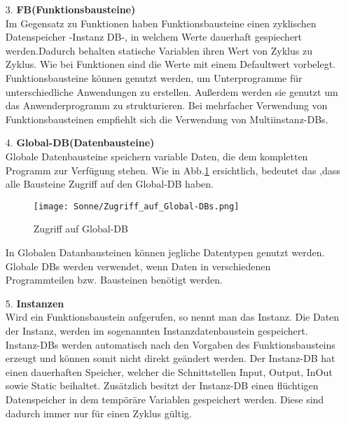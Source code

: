 \begin{itemize}
        \item[3.] \textbf{FB(Funktionsbausteine)} \\
            Im Gegensatz zu Funktionen haben Funktionsbausteine einen zyklischen Datenspeicher -Instanz DB-, in welchem Werte dauerhaft gespiechert werden.Dadurch behalten statische Variablen ihren Wert von Zyklus zu Zyklus. Wie bei Funktionen sind die Werte mit einem Defaultwert vorbelegt.\\
            Funktionsbausteine können genutzt werden, um Unterprogramme für unterschiedliche Anwendungen zu erstellen. Außerdem werden sie genutzt um das Anwenderprogramm zu strukturieren. Bei mehrfacher Verwendung von Funktionsbausteinen empfiehlt sich die Verwendung von Multiinstanz-DBs.
            \cite{Programmierleitfaden_für_S7-1500}
        
        \item[4.] \textbf{Global-DB(Datenbausteine)} \\
            Globale Datenbausteine speichern variable Daten, die dem kompletten Programm zur Verfügung stehen. Wie in Abb.\ref{Zugriff auf Global-DB} ersichtlich, bedeutet das ,dass alle Bausteine Zugriff auf den Global-DB haben.

            \begin{figure}[h]
                \centering
                \texttt{[image: Sonne/Zugriff\_auf\_Global-DBs.png]}
                \caption{Zugriff auf Global-DB \cite{Programmierleitfaden_für_S7-1500}}
                \label{Zugriff auf Global-DB}
            \end{figure}

            In Globalen Datanbausteinen können jegliche Datentypen genutzt werden.\\
            Globale DBs werden verwendet, wenn Daten in verschiedenen Programmteilen bzw. Bausteinen benötigt werden.
            \cite{Programmierleitfaden_für_S7-1500}

        \item[5.] \textbf{Instanzen} \\
            Wird ein Funktionsbaustein aufgerufen, so nennt man das Instanz. Die Daten der Instanz, werden im sogenannten Instanzdatenbaustein gespeichert. Instanz-DBs werden automatisch nach den Vorgaben des Funktionsbausteins erzeugt und können somit nicht direkt geändert werden. Der Instanz-DB hat einen dauerhaften Speicher, welcher die Schnittstellen Input, Output, InOut sowie Static beihaltet. Zusätzlich besitzt der Instanz-DB einen flüchtigen Datenspeicher in dem tempöräre Variablen gespeichert werden. Diese sind dadurch immer nur für einen Zyklus gültig.
            

\end{itemize}
